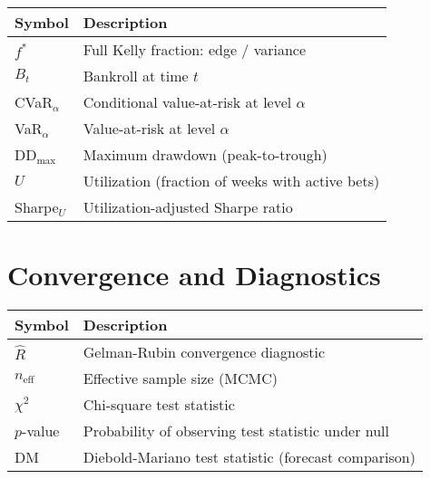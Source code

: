 \begin{tabular}{ll}
\toprule
\textbf{Symbol} & \textbf{Description} \\
\midrule
$f^*$ & Full Kelly fraction: edge / variance \\
$B_t$ & Bankroll at time $t$ \\
CVaR$_\alpha$ & Conditional value-at-risk at level $\alpha$ \\
VaR$_\alpha$ & Value-at-risk at level $\alpha$ \\
DD$_{\max}$ & Maximum drawdown (peak-to-trough) \\
$U$ & Utilization (fraction of weeks with active bets) \\
Sharpe$_U$ & Utilization-adjusted Sharpe ratio \\
\bottomrule
\end{tabular}

\section*{Convergence and Diagnostics}

\begin{tabular}{ll}
\toprule
\textbf{Symbol} & \textbf{Description} \\
\midrule
$\hat{R}$ & Gelman-Rubin convergence diagnostic \\
$n_{\text{eff}}$ & Effective sample size (MCMC) \\
$\chi^2$ & Chi-square test statistic \\
$p$-value & Probability of observing test statistic under null \\
DM & Diebold-Mariano test statistic (forecast comparison) \\
\bottomrule
\end{tabular}